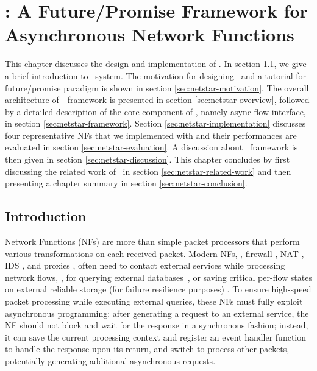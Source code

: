 \chapter {\netstar: A Future/Promise Framework for Asynchronous Network Functions}
\label{ch:netstar}

This chapter discusses the design and implementation of \netstar. In section \ref{sec:netstar-introduction}, we give a brief introduction to \netstar~system. The motivation for designing \netstar~and a tutorial for future/promise paradigm is shown in section \ref{sec:netstar-motivation}. The overall architecture of~\netstar~framework is presented in section \ref{sec:netstar-overview}, followed by a detailed description of the core component of \netstar, namely async-flow interface, in section \ref{sec:netstar-framework}. Section \ref{sec:netstar-implementation} discusses four representative NFs that we implemented with \netstar and their performances are evaluated in section \ref{sec:netstar-evaluation}. A discussion about \netstar~framework is then given in section \ref{sec:netstar-discussion}. This chapter concludes by first discussing the related work of \netstar~in section \ref{sec:netstar-related-work} and then presenting a chapter summary in section \ref{sec:netstar-conclusion}.

\section{Introduction} \label{sec:netstar-introduction}

Network Functions (NFs) are more than simple packet processors that perform various transformations on each received packet. Modern NFs, \eg, firewall \cite{201545}, NAT \cite{201545}, IDS \cite{bro}, and proxies \cite{haproxy, project-clearwater}, often need to contact external services while processing network flows, \eg, for
querying external databases~\cite{telephone-number-mapping, bro-scripting-tutorial}, or saving critical per-flow states on external reliable storage (for failure resilience purposes) \cite{201545}. To ensure high-speed packet processing while executing external queries, these NFs must fully exploit asynchronous programming: after generating a request to an external service, the NF should not block and wait for the response in a synchronous fashion; instead, it can save the current processing context and register an event handler function to handle the response upon its return, and switch to process other packets, potentially generating additional asynchronous requests.

